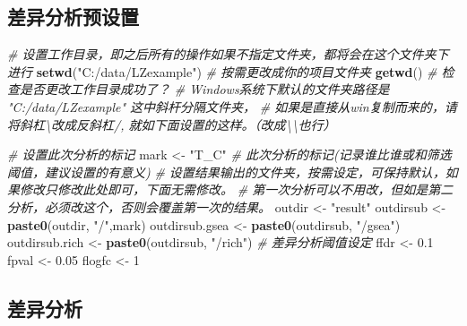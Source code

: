 \documentclass[
]{book}
\newenvironment{Shaded}{\begin{snugshade}}{\end{snugshade}}
\newcommand{\CommentTok}[1]{\textcolor[rgb]{0.56,0.35,0.01}{\textit{#1}}}
\newcommand{\DecValTok}[1]{\textcolor[rgb]{0.00,0.00,0.81}{#1}}
\newcommand{\FloatTok}[1]{\textcolor[rgb]{0.00,0.00,0.81}{#1}}
\newcommand{\FunctionTok}[1]{\textcolor[rgb]{0.13,0.29,0.53}{\textbf{#1}}}
\newcommand{\NormalTok}[1]{#1}
\newcommand{\OtherTok}[1]{\textcolor[rgb]{0.56,0.35,0.01}{#1}}
\newcommand{\StringTok}[1]{\textcolor[rgb]{0.31,0.60,0.02}{#1}}
\begin{document}
\hypertarget{ux5deeux5f02ux5206ux6790ux9884ux8bbeux7f6e}{%
\subsection{差异分析预设置}\label{ux5deeux5f02ux5206ux6790ux9884ux8bbeux7f6e}}

\begin{Shaded}
\begin{Highlighting}[]
\CommentTok{\# 设置工作目录，即之后所有的操作如果不指定文件夹，都将会在这个文件夹下进行}
\FunctionTok{setwd}\NormalTok{(}\StringTok{"C:/data/LZexample"}\NormalTok{)  }\CommentTok{\# 按需更改成你的项目文件夹}
\FunctionTok{getwd}\NormalTok{() }\CommentTok{\# 检查是否更改工作目录成功了？}
\CommentTok{\# Windows系统下默认的文件夹路径是 "C:/data/LZexample" 这中斜杆分隔文件夹，}
\CommentTok{\# 如果是直接从win复制而来的，请将斜杠\textbackslash{}改成反斜杠/, 就如下面设置的这样。（改成\textbackslash{}\textbackslash{}也行）}

\CommentTok{\# 设置此次分析的标记}
\NormalTok{mark }\OtherTok{\textless{}{-}} \StringTok{"T\_C"}  \CommentTok{\# 此次分析的标记(记录谁比谁或和筛选阈值，建议设置的有意义)}
\CommentTok{\# 设置结果输出的文件夹，按需设定，可保持默认，如果修改只修改此处即可，下面无需修改。}
\CommentTok{\# 第一次分析可以不用改，但如是第二分析，必须改这个，否则会覆盖第一次的结果。}
\NormalTok{outdir }\OtherTok{\textless{}{-}} \StringTok{"result"}  
\NormalTok{outdirsub }\OtherTok{\textless{}{-}} \FunctionTok{paste0}\NormalTok{(outdir, }\StringTok{"/"}\NormalTok{,mark)}
\NormalTok{outdirsub.gsea }\OtherTok{\textless{}{-}} \FunctionTok{paste0}\NormalTok{(outdirsub, }\StringTok{"/gsea"}\NormalTok{)}
\NormalTok{outdirsub.rich }\OtherTok{\textless{}{-}} \FunctionTok{paste0}\NormalTok{(outdirsub, }\StringTok{"/rich"}\NormalTok{)}
\CommentTok{\# 差异分析阈值设定}
\NormalTok{ffdr }\OtherTok{\textless{}{-}} \FloatTok{0.1}
\NormalTok{fpval }\OtherTok{\textless{}{-}} \FloatTok{0.05}
\NormalTok{flogfc }\OtherTok{\textless{}{-}} \DecValTok{1}
\end{Highlighting}
\end{Shaded}

\hypertarget{ux5deeux5f02ux5206ux6790}{%
\subsection{差异分析}\label{ux5deeux5f02ux5206ux6790}}
\end{document}
